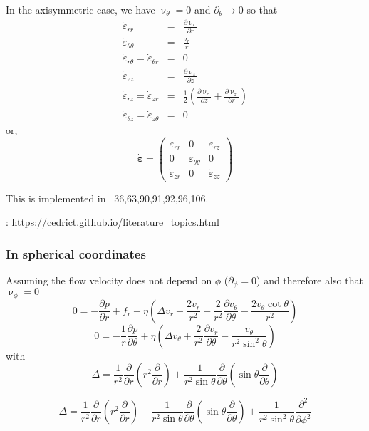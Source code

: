 In the axisymmetric case, we have $\upnu_\theta=0$ and $\partial_\theta \rightarrow 0$ so that 
\begin{eqnarray}
\dot\varepsilon_{rr} &=& \frac{\partial \upnu_r}{\partial r}  \\
\dot\varepsilon_{\theta\theta} &=& \frac{\upnu_r}{r} \\
\dot\varepsilon_{r\theta} = \dot\varepsilon_{\theta r} &=& 0\\
\dot\varepsilon_{zz} &=& \frac{\partial \upnu_z}{\partial z} \\
\dot{\varepsilon}_{rz} = \dot{\varepsilon}_{zr} 
&=& \frac{1}{2}\left( \frac{\partial \upnu_r}{\partial z} + \frac{\partial \upnu_z}{\partial r}  \right) \\
\dot{\varepsilon}_{\theta z} = \dot{\varepsilon}_{z \theta} &=& 0
\end{eqnarray}
or, 
\[
\dot{\bm\varepsilon}
=
\left(
\begin{array}{ccc}
\dot\varepsilon_{rr} & 0 & \dot{\varepsilon}_{rz} \\
0 & \dot{\varepsilon}_{\theta\theta}  & 0 \\
\dot{\varepsilon}_{zr} & 0 & \dot\varepsilon_{zz}
\end{array}
\right)
\]

This is implemented in \stone~36,63,90,91,92,96,106.

\Literature: \url{https://cedrict.github.io/literature_topics.html}



\subsubsection{In spherical coordinates}

Assuming the flow velocity does not depend on $\phi$ ($\partial_\phi =0$) and therefore also that $\upnu_\phi=0$
\[
0=-\frac{\partial p}{\partial r} + f_r + \eta \left(\Delta v_r - \frac{2v_r}{r^2} -\frac{2}{r^2} \frac{\partial v_\theta}{\partial \theta} - \frac{2 v_\theta \cot \theta }{r^2} \right)
\]
\[
0 = -\frac{1}{r} \frac{\partial p}{\partial \theta} + \eta \left(\Delta v_\theta + \frac{2}{r^2} \frac{\partial v_r}{\partial \theta}  - \frac{v_\theta}{r^2 \sin^2 \theta} \right)
\]
with
\[
\Delta = \frac{1}{r^2} \frac{\partial }{\partial r}\left( r^2 \frac{\partial }{\partial r}\right)
+\frac{1}{r^2 \sin\theta} \frac{\partial }{\partial \theta}
\left(
\sin\theta \frac{\partial }{\partial\theta}
\right)
\]


\[
\Delta = \frac{1}{r^2} \frac{\partial }{\partial r}\left( r^2 \frac{\partial }{\partial r}\right)
+\frac{1}{r^2 \sin\theta} \frac{\partial }{\partial \theta}
\left(
\sin\theta \frac{\partial }{\partial\theta}
\right)
+ \frac{1}{r^2 \sin^2\theta} \frac{\partial^2 }{\partial\phi^2}
\]

